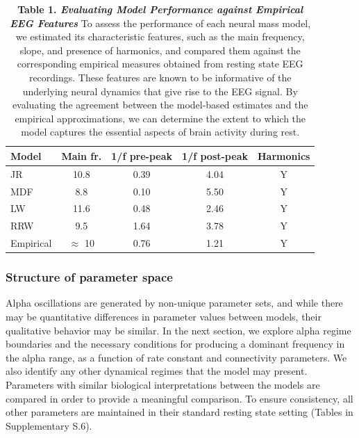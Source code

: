 \documentclass[12pt,twoside]{article}
\begin{document}
\begin{table}[h]  
\centering %
\begin{tabular}{l c c c c} %
\hline\hline   
Model & Main fr. & 1/f pre-peak & 1/f post-peak & Harmonics 
\\ 
\hline   
 JR & 10.8 & 0.39 & 4.04 & Y \\
 MDF & 8.8 & 0.10 & 5.50 & Y \\
LW & 11.6 & 0.48 & 2.46 & Y \\
RRW & 9.5 & 1.64 & 3.78 & Y \\
\hline\hline %
Empirical & $\approx$ 10 & 0.76 & 1.21 & Y\\
\hline
\end{tabular}  
 \caption*{\textbf{Table 1. \textit{Evaluating Model Performance against Empirical EEG Features}}  To assess the performance of each neural mass model, we estimated its characteristic features, such as the main frequency, slope, and presence of harmonics, and compared them against the corresponding empirical measures obtained from resting state EEG recordings. These features are known to be informative of the underlying neural dynamics that give rise to the EEG signal. By evaluating the agreement between the model-based estimates and the empirical approximations, we can determine the extent to which the model captures the essential aspects of brain activity during rest.}  
\end{table}  

\subsubsection{Structure of parameter space}
Alpha oscillations are generated by non-unique parameter sets, and while there may be quantitative differences in parameter values between models, their qualitative behavior may be similar. In the next section, we explore alpha regime boundaries and the necessary conditions for producing a dominant frequency in the alpha range, as a function of rate constant and connectivity parameters. We also identify any other dynamical regimes that the model may present. Parameters with similar biological interpretations between the models are compared in order to provide a meaningful comparison.  
To ensure consistency, all other parameters are maintained in their standard resting state setting (Tables in Supplementary S.6).
\end{document}
